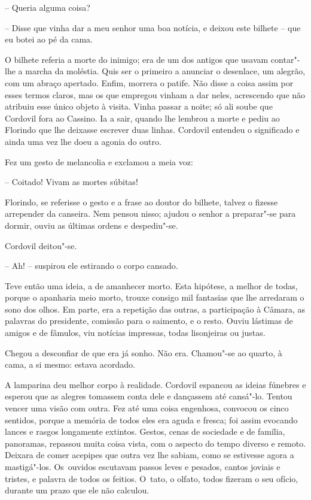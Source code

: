 -- Queria alguma coisa?

-- Disse que vinha dar a meu senhor uma boa notícia, e deixou este
bilhete -- que eu botei ao pé da cama.

O bilhete referia a morte do inimigo; era de um dos antigos que usavam
contar"-lhe a marcha da moléstia. Quis ser o primeiro a anunciar o
desenlace, um alegrão, com um abraço apertado. Enfim, morrera o patife.
Não disse a coisa assim por esses termos claros, mas os que empregou
vinham a dar neles, acrescendo que não atribuiu esse único objeto à
visita. Vinha passar a noite; só ali soube que Cordovil fora ao Cassino.
Ia a sair, quando lhe lembrou a morte e pediu ao Florindo que lhe
deixasse escrever duas linhas. Cordovil entendeu o significado e ainda
uma vez lhe doeu a agonia do outro.

Fez um gesto de melancolia e exclamou a meia voz:

-- Coitado! Vivam as mortes súbitas!

Florindo, se referisse o gesto e a frase ao doutor do bilhete, talvez o
fizesse arrepender da canseira. Nem pensou nisso; ajudou o senhor a
preparar"-se para dormir, ouviu as últimas ordens e despediu"-se.

Cordovil deitou"-se.

-- Ah! -- suspirou ele estirando o corpo cansado.

Teve então uma ideia, a de amanhecer morto. Esta hipótese, a melhor de
todas, porque o apanharia meio morto, trouxe consigo mil fantasias que
lhe arredaram o sono dos olhos. Em parte, era a repetição das outras, a
participação à Câmara, as palavras do presidente, comissão para o
saimento, e o resto. Ouviu lástimas de amigos e de fâmulos, viu notícias
impressas, todas lisonjeiras ou justas.

Chegou a desconfiar de que era já sonho. Não era. Chamou"-se ao quarto, à
cama, a si mesmo: estava acordado.

A lamparina deu melhor corpo à realidade. Cordovil espancou as ideias
fúnebres e esperou que as alegres tomassem conta dele e dançassem até
cansá"-lo. Tentou vencer uma visão com outra. Fez até uma coisa
engenhosa, convocou os cinco sentidos, porque a memória de todos eles
era aguda e fresca; foi assim evocando lances e rasgos longamente
extintos. Gestos, cenas de sociedade e de família, panoramas, repassou
muita coisa vista, com o aspecto do tempo diverso e remoto. Deixara de
comer acepipes que outra vez lhe sabiam, como se estivesse agora a
mastigá"-los. Os~ouvidos escutavam passos leves e pesados, cantos joviais
e tristes, e palavra de todos os feitios. O~tato, o olfato, todos
fizeram o seu ofício, durante um prazo que ele não calculou.

